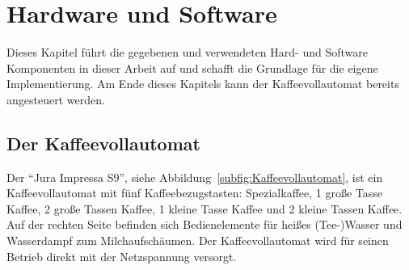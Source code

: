 \chapter{Hardware und Software}\label{ch:HardwareUndSoftware}
Dieses Kapitel führt die gegebenen und verwendeten Hard- und Software Komponenten in dieser Arbeit auf und schafft die Grundlage für die eigene Implementierung.
Am Ende dieses Kapitels kann der Kaffeevollautomat bereits angesteuert werden.

\section{Der Kaffeevollautomat}
Der "`Jura Impressa S9"', siehe Abbildung~\ref{subfig:Kaffeevollautomat}, ist ein Kaffeevollautomat mit fünf Kaffeebezugstasten: Spezialkaffee, 1 große Tasse Kaffee, 2 große Tassen Kaffee, 1 kleine Tasse Kaffee und 2 kleine Tassen Kaffee.
Auf der rechten Seite befinden sich Bedienelemente für heißes (Tee-)Wasser und Wasserdampf zum Milchaufschäumen.
Der Kaffeevollautomat wird für seinen Betrieb direkt mit der Netzspannung versorgt.


